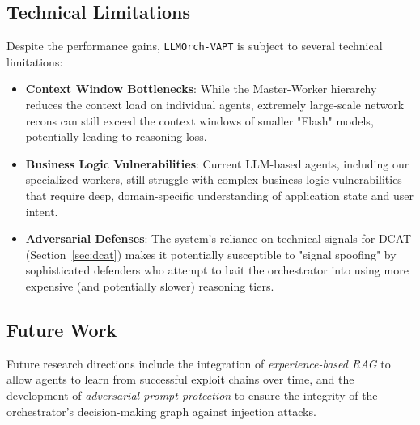 \subsection{Technical Limitations}
Despite the performance gains, \texttt{LLMOrch-VAPT} is subject to several technical limitations:
\begin{itemize}
    \item \textbf{Context Window Bottlenecks}: While the Master-Worker hierarchy reduces the context load on individual agents, extremely large-scale network recons can still exceed the context windows of smaller "Flash" models, potentially leading to reasoning loss.
    \item \textbf{Business Logic Vulnerabilities}: Current LLM-based agents, including our specialized workers, still struggle with complex business logic vulnerabilities that require deep, domain-specific understanding of application state and user intent.
    \item \textbf{Adversarial Defenses}: The system's reliance on technical signals for DCAT (Section~\ref{sec:dcat}) makes it potentially susceptible to "signal spoofing" by sophisticated defenders who attempt to bait the orchestrator into using more expensive (and potentially slower) reasoning tiers.
\end{itemize}

\subsection{Future Work}
Future research directions include the integration of \textit{experience-based RAG} to allow agents to learn from successful exploit chains over time, and the development of \textit{adversarial prompt protection} to ensure the integrity of the orchestrator's decision-making graph against injection attacks.
